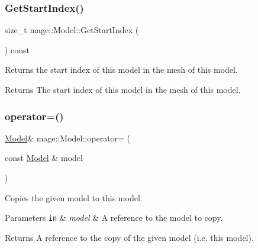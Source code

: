 \subsubsection{\texorpdfstring{Get\+Start\+Index()}{GetStartIndex()}}
{\footnotesize\ttfamily size\+\_\+t mage\+::\+Model\+::\+Get\+Start\+Index (\begin{DoxyParamCaption}{ }\end{DoxyParamCaption}) const\hspace{0.3cm}{\ttfamily [noexcept]}}

Returns the start index of this model in the mesh of this model.

\begin{DoxyReturn}{Returns}
The start index of this model in the mesh of this model. 
\end{DoxyReturn}
\hypertarget{classmage_1_1_model_a563515c64ec39cfcda9f6ca37576391b}{}\label{classmage_1_1_model_a563515c64ec39cfcda9f6ca37576391b} 
\subsubsection{\texorpdfstring{operator=()}{operator=()}\hspace{0.1cm}{\footnotesize\ttfamily [1/2]}}
{\footnotesize\ttfamily \hyperlink{classmage_1_1_model}{Model}\& mage\+::\+Model\+::operator= (\begin{DoxyParamCaption}\item[{const \hyperlink{classmage_1_1_model}{Model} \&}]{model }\end{DoxyParamCaption})\hspace{0.3cm}{\ttfamily [delete]}}

Copies the given model to this model.


\begin{DoxyParams}[1]{Parameters}
\mbox{\tt in}  & {\em model} & A reference to the model to copy. \\
\hline
\end{DoxyParams}
\begin{DoxyReturn}{Returns}
A reference to the copy of the given model (i.\+e. this model). 
\end{DoxyReturn}
\hypertarget{classmage_1_1_model_a084e30d15822bfefa79128f30a57cc02}{}\label{classmage_1_1_model_a084e30d15822bfefa79128f30a57cc02} 
